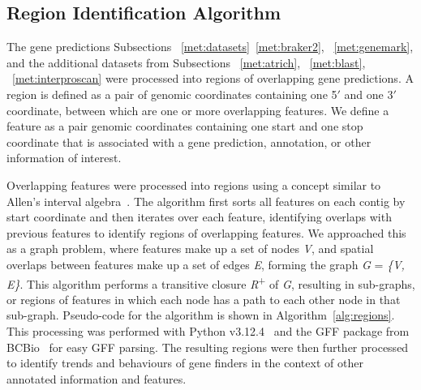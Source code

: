 \subsection{Region Identification Algorithm}
\label{section:region-met}

The gene predictions Subsections ~\ref{met:datasets}~\ref{met:braker2}, ~\ref{met:genemark}, and the additional datasets from Subsections ~\ref{met:atrich}, ~\ref{met:blast}, ~\ref{met:interproscan} were processed into regions of overlapping gene predictions. A region is defined as a pair of genomic coordinates containing one 5$'$ and one 3$'$ coordinate, between which are one or more overlapping features.
We define a feature as a pair genomic
coordinates containing one start and one stop coordinate that is
associated with a gene prediction, annotation, or other information of
interest.

Overlapping features were processed into regions using a concept
similar to Allen's interval algebra~\cite{dechter2003}. The
algorithm first sorts all features on each contig by start coordinate
and then iterates over each feature, identifying overlaps with
previous features to identify regions of overlapping features. We
approached this as a graph problem, where features make up a set of
nodes \textit{V}, and spatial overlaps between features make up a set
of edges \textit{E}, forming the graph \textit{G} = \textit{\{V,
    E\}}. This algorithm performs a transitive closure
\textit{R}\textsuperscript{+} of \textit{G}, resulting in sub-graphs,
or regions of features in which each node has a path to each other
node in that sub-graph. Pseudo-code for the algorithm is shown in
Algorithm~\ref{alg:regions}. This processing was performed with Python
v3.12.4~\cite{foundationa} and the GFF package from BCBio~\cite{chapmana}
for easy GFF parsing. The resulting regions were then further
processed to identify trends and behaviours of gene finders in the
context of other annotated information and features.

